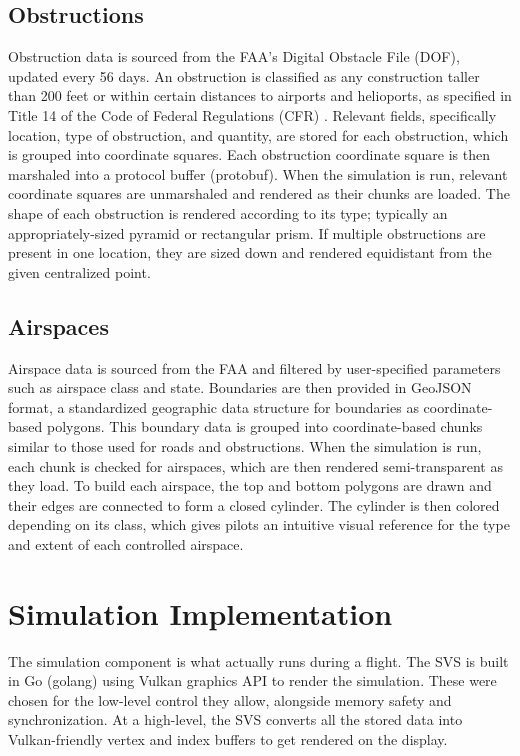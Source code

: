 \documentclass[journal ]{new-aiaa}
\begin{document}
\subsection{Obstructions}
Obstruction data is sourced from the FAA's Digital Obstacle File (DOF), updated every 56 days. An obstruction is classified as any construction taller than 200 feet or within certain distances to airports and helioports, as specified in Title 14 of the Code of Federal Regulations (CFR) \cite{14cfr77}.
Relevant fields, specifically location, type of obstruction, and quantity, are stored for each obstruction, which is grouped into coordinate squares. Each obstruction coordinate square is then marshaled into a protocol buffer (protobuf). When the simulation is run, relevant coordinate squares are unmarshaled and rendered as their chunks are loaded. The shape of each obstruction is rendered according to its type; typically an appropriately-sized pyramid or rectangular prism. If multiple obstructions are present in one location, they are sized down and rendered equidistant from the given centralized point.
\subsection{Airspaces}
Airspace data is sourced from the FAA and filtered by user-specified parameters such as airspace class and state. Boundaries are then provided in GeoJSON format, a standardized geographic data structure for boundaries as coordinate-based polygons. This boundary data is grouped into coordinate-based chunks similar to those used for roads and obstructions. When the simulation is run, each chunk is checked for airspaces, which are then rendered semi-transparent as they load. To build each airspace, the top and bottom polygons are drawn and their edges are connected to form a closed cylinder. The cylinder is then colored depending on its class, which gives pilots an intuitive visual reference for the type and extent of each controlled airspace.
\section{Simulation Implementation}
The simulation component is what actually runs during a flight. The SVS is built in Go (golang) using Vulkan graphics API to render the simulation. These were chosen for the low-level control they allow, alongside memory safety and synchronization. At a high-level, the SVS converts all the stored data into Vulkan-friendly vertex and index buffers to get rendered on the display.
\end{document}
